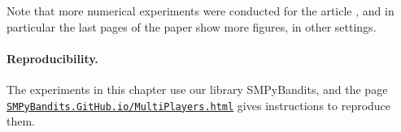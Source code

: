 Note that more numerical experiments were conducted for the article \cite{Besson2018ALT}, and in particular the last pages of the paper show more figures, in other settings.



\paragraph{Reproducibility.}

The experiments in this chapter use our library SMPyBandits,
and the page \href{https://SMPyBandits.GitHub.io/MultiPlayers.html}{\texttt{SMPyBandits.GitHub.io/MultiPlayers.html}} gives instructions to reproduce them.
